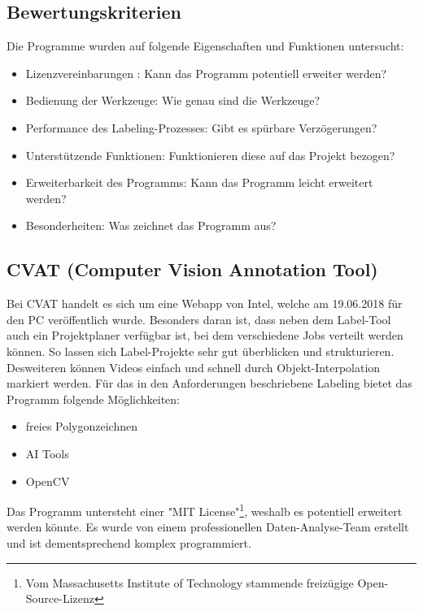\documentclass[11pt]{scrartcl}
\begin{document}
\subsection{Bewertungskriterien}
\label{sec:Bewertungskriterien}

\noindent
Die Programme wurden auf folgende Eigenschaften und Funktionen untersucht:
\begin{itemize}
	\item Lizenzvereinbarungen : Kann das Programm potentiell erweiter werden?
	\item Bedienung der Werkzeuge: Wie genau sind die Werkzeuge?
	\item Performance des Labeling-Prozesses: Gibt es spürbare Verzögerungen?
	\item Unterstützende Funktionen: Funktionieren diese auf das Projekt bezogen?
	\item Erweiterbarkeit des Programms: Kann das Programm leicht erweitert werden?
	\item Besonderheiten: Was zeichnet das Programm aus?
\end{itemize}

\subsection{CVAT (Computer Vision Annotation Tool)}
\label{sec:CVAT (Computer Vision Annotation Tool)}

Bei CVAT handelt es sich um eine Webapp von Intel, welche am 19.06.2018 für den PC veröffentlich wurde. Besonders daran ist, dass neben dem Label-Tool auch ein Projektplaner verfügbar ist, bei dem verschiedene Jobs verteilt werden können. So lassen sich Label-Projekte sehr gut überblicken und strukturieren. Desweiteren können Videos einfach und schnell durch Objekt-Interpolation markiert werden. Für das in den Anforderungen beschriebene Labeling  bietet das Programm folgende Möglichkeiten:
\begin{itemize}
	\item freies Polygonzeichnen
	\item AI Tools
	\item OpenCV
\end{itemize}
Das Programm untersteht einer "MIT License"\footnote{Vom Massachusetts Institute of Technology stammende freizügige Open-Source-Lizenz}, weshalb es potentiell erweitert werden könnte. Es wurde von einem professionellen Daten-Analyse-Team erstellt und ist dementsprechend komplex programmiert.
\\
\end{document}
